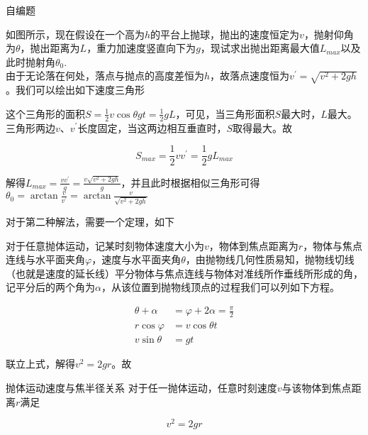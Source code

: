 \begin{ep}{自编题}{}



如图所示，现在假设在一个高为$h$的平台上抛球，抛出的速度恒定为$v$，抛射仰角为$\theta$，抛出距离为$L$，重力加速度竖直向下为$g$，现试求出抛出距离最大值$L_{max}$以及此时抛射角$\theta_0$.
~\\

由于无论落在何处，落点与抛点的高度差恒为$h$，故落点速度恒为$v^{\prime} = \sqrt{v^2 + 2gh}$。我们可以绘出如下速度三角形



这个三角形的面积$S=\frac{1}{2} v \cos \theta gt = \frac{1}{2} g L$，可见，当三角形面积$S$最大时，$L$最大。三角形两边$v$、$v^{\prime}$长度固定，当这两边相互垂直时，$S$取得最大。故

$$S_{max} = \frac{1}{2} v v^{\prime} = \frac{1}{2} g L_{max}$$

解得$L_{max} = \frac{v v^{\prime}}{g} = \frac{v\sqrt{v^2 + 2gh}}{g}$，并且此时根据相似三角形可得$\theta_0 = \arctan{\frac{v}{v^{\prime}}} = \arctan{\frac{v}{\sqrt{v^2 + 2gh}}}$

\end{ep}

对于第二种解法，需要一个定理，如下



对于任意抛体运动，记某时刻物体速度大小为$v$，物体到焦点距离为$r$，物体与焦点连线与水平面夹角$\varphi$，速度与水平面夹角$\theta$，由抛物线几何性质易知，抛物线切线（也就是速度的延长线）平分物体与焦点连线与物体对准线所作垂线所形成的角，记平分后的两个角为$\alpha$，从该位置到抛物线顶点的过程我们可以列如下方程。

\begin{subequations}
\begin{align*}
\theta + \alpha &= \varphi + 2 \alpha = \frac{\pi}{2} \\
r \cos \varphi &= v \cos \theta t \\
v \sin \theta &= gt 
\end{align*}
\end{subequations}

联立上式，解得$v^2 = 2gr$。故

\begin{theo}{抛体运动速度与焦半径关系}{}
对于任一抛体运动，任意时刻速度$v$与该物体到焦点距离$r$满足

$$v^2 = 2gr$$

\end{theo}

